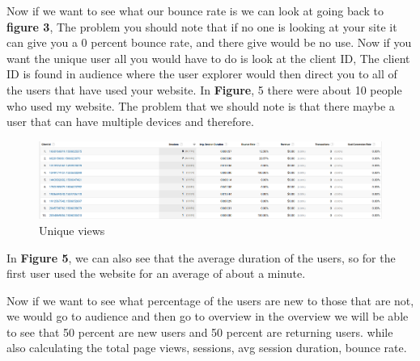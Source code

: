 \documentclass{article}
\begin{document}
Now if we want to see what our bounce rate is we can look at going back to \textbf{figure 3}, The problem you should note that if no one is looking at your site it can give you a 0 percent bounce rate, and there give would be no use. Now if you want the unique user all you would have to do is look at the client ID, The client ID is found in audience where the user explorer would then direct you to all of the users that have used your website. In \textbf{Figure}, 5  there were about 10 people who used my website. The problem that we should note is that there maybe a user that can have  multiple devices and therefore. 

\begin{figure}[h!]
\includegraphics[scale = .5]{unique.png}
\centering
\caption{Unique views}
\end{figure}

In \textbf{Figure 5}, we can also see that the average duration of the users, so for the first user used the website for an average of about a minute. 

Now if we want to see what percentage of the users are new to those that are not, we would go to audience and then go to overview in the overview we will be able to see that 50 percent are new users and 50 percent are returning users.  while also calculating the total page views, sessions, avg session duration, bounce rate. 
   
\end{document}
